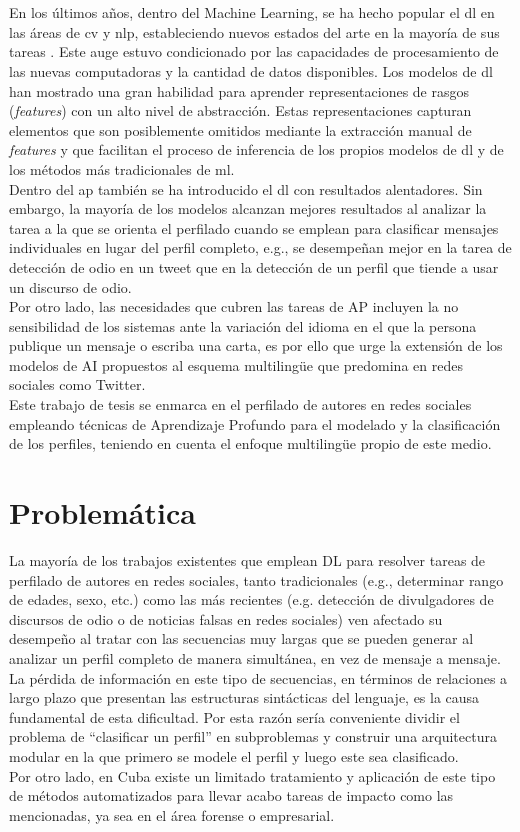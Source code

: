 \\
\\
En los últimos años, dentro del Machine Learning, se ha hecho popular el \acl{dl} en las áreas de \ac{cv} y \ac{nlp}, estableciendo nuevos estados del arte en la mayoría de sus tareas \citep{electronics8030292}. Este auge estuvo condicionado por las capacidades de procesamiento de las nuevas computadoras y la cantidad de datos disponibles. Los modelos de \ac{dl} han mostrado una gran habilidad para aprender representaciones de rasgos (\textit{features}) con un alto nivel de abstracción. Estas representaciones capturan elementos que son posiblemente omitidos mediante la extracción manual de \textit{features} y que facilitan el proceso de inferencia de los propios modelos de \ac{dl} y de los métodos más tradicionales de \ac{ml}. 
\\
Dentro del \ac{ap} también se ha introducido el \acl{dl} con resultados alentadores. Sin embargo, la mayoría de los modelos alcanzan mejores resultados al analizar la tarea a la que se orienta el perfilado cuando se emplean para clasificar mensajes individuales en lugar del perfil completo, e.g., se desempeñan mejor en la tarea de detección de odio en un tweet que en la detección de un perfil que tiende a usar un discurso de odio. 
\\
Por otro lado, las necesidades que cubren las tareas de AP incluyen la no sensibilidad de los sistemas ante la variación del idioma en el que la persona publique un mensaje o escriba una carta, es por ello que urge la extensión de los modelos de AI propuestos al esquema multilingüe que predomina en redes sociales como Twitter. \\Este trabajo de tesis se enmarca en el perfilado de autores en redes sociales empleando técnicas de Aprendizaje Profundo para el modelado y la clasificación de los perfiles, teniendo en cuenta el enfoque multilingüe propio de este medio. 

\section*{Problemática}
La mayoría de los trabajos existentes que emplean DL para resolver tareas de perfilado de autores en redes sociales, tanto tradicionales (e.g., determinar rango de edades, sexo, etc.) como las más recientes (e.g. detección de divulgadores de discursos de odio o de noticias falsas en redes sociales) ven afectado su desempeño al tratar con las secuencias muy largas que se pueden generar al analizar un perfil completo de manera simultánea, en vez de mensaje a mensaje. La pérdida de información en este tipo de secuencias, en términos de relaciones a largo plazo que presentan las estructuras sintácticas del lenguaje, es la causa fundamental de esta dificultad. Por esta razón sería conveniente dividir el problema de ``clasificar un perfil'' en subproblemas y construir una arquitectura modular en la que primero se modele el perfil y luego este sea clasificado.
\\
Por otro lado, en Cuba existe un limitado tratamiento y aplicación de este tipo de métodos automatizados para llevar acabo tareas de impacto como las mencionadas, ya sea en el área forense o empresarial.

